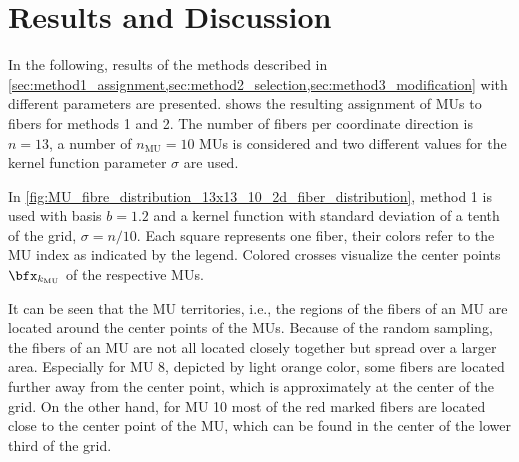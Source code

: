 \section{Results and Discussion}\label{sec:mu_results_and_discussion}

In the following, results of the methods described in \cref{sec:method1_assignment,sec:method2_selection,sec:method3_modification} with different parameters are presented.
 shows the resulting assignment of MUs to fibers for methods 1 and 2. The number of fibers per coordinate direction is $n=13$, a number of $n_\text{MU} = 10$ MUs is considered and two different values for the kernel function parameter $\sigma$ are used.

In \cref{fig:MU_fibre_distribution_13x13_10_2d_fiber_distribution}, method 1 is used with basis $b=1.2$ and a kernel function with standard deviation of a tenth of the grid, $\sigma=n/10$. Each square represents one fiber, their colors refer to the MU index as indicated by the legend. Colored crosses visualize the center points $\bfx_{k_\text{MU}}$ of the respective MUs.

It can be seen that the MU territories, i.e., the regions of the fibers of an MU are located around the center points of the MUs. Because of the random sampling, the fibers of an MU are not all located closely together but spread over a larger area. Especially for MU 8, depicted by light orange color, some fibers are located further away from the center point, which is approximately at the center of the grid. On the other hand, for MU 10 most of the red marked fibers are located close to the center point of the MU, which can be found in the center of the lower third of the grid.

